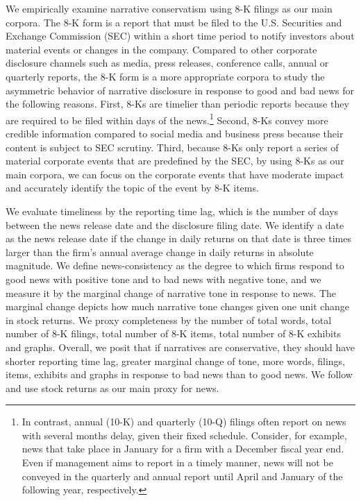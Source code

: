 \documentclass[letterpaper,12pt]{article}
\begin{document}
\begin{spacing}{1.5}
We empirically examine narrative conservatism using 8-K filings as our main corpora. The 8-K form is a report that must be filed to the U.S. Securities and Exchange Commission (SEC) within a short time period to notify investors about material events or changes in the company. Compared to other corporate disclosure channels such as media, press releases, conference calls, annual or quarterly reports, the 8-K form is a more appropriate corpora to study the asymmetric behavior of narrative disclosure in response to good and bad news for the following reasons. First, 8-Ks are timelier than periodic reports because they are required to be filed within days of the news.\footnote{In contrast, annual (10-K) and quarterly (10-Q) filings often report on news with several months delay, given their fixed schedule. Consider, for example, news that take place in January for a firm with a December fiscal year end. Even if management aims to report in a timely manner, news will not be conveyed in the quarterly and annual report until April and January of the following year, respectively.} Second, 8-Ks convey more credible information compared to social media and business press because their content is subject to SEC scrutiny. Third, because 8-Ks only report a series of material corporate events that are predefined by the SEC, by using 8-Ks as our main corpora, we can focus on the corporate events that have moderate impact and accurately identify the topic of the event by 8-K items.

We evaluate timeliness by the reporting time lag, which is the number of days between the news release date and the disclosure filing date. We identify a date as the news release date if the change in daily returns on that date is three times larger than the firm's annual average change in daily returns in absolute magnitude. We define news-consistency as the degree to which firms respond to good news with positive tone and to bad news with negative tone, and we measure it by the marginal change of narrative tone in response to news. The marginal change depicts how much narrative tone changes given one unit change in stock returns. We proxy completeness by the number of total words, total number of 8-K filings, total number of 8-K items, total number of 8-K exhibits and graphs. 
Overall, we posit that if narratives are conservative, they should have shorter reporting time lag, greater marginal change of tone, more words, filings, items, exhibits and graphs in response to bad news than to good news. We follow  and use stock returns as our main proxy for news.


\end{spacing}
\end{document}
